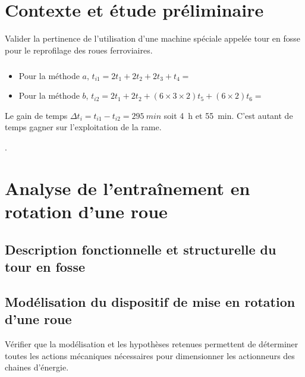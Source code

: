 \documentclass[10pt,fleqn]{article} %
\begin{document}

\vspace{4.5cm}
\pagestyle{fancy}
\thispagestyle{plain}


\def\columnseprulecolor{\color{ocre}}
\setlength{\columnseprule}{0.4pt} 

\section{Contexte et étude préliminaire}

\begin{obj}
Valider la pertinence de l’utilisation d’une machine spéciale appelée tour en fosse pour le reprofilage
des roues ferroviaires.
\end{obj}

\subparagraph{}

\begin{itemize}
\item Pour la méthode $a$, $t_{i1} =2t_1+2t_2+ 2t_3 +t_4 = $ %
\item Pour la méthode $b$, $t_{i2} =2t_1+2t_2+ \left( 6\times 3 \times 2 \right)t_5 +\left( 6 \times 2 \right)t_6 =$%
\end{itemize}

Le gain de temps $\Delta t_i = t_{i1}-t_{i2}=\SI{295}{min}$ soit \SI{4}{h} et \SI{55}{min}. C'est autant de temps gagner sur l'exploitation de la rame. 


.

\section{Analyse de l’entraînement en rotation d’une roue}
\subsection{Description fonctionnelle et structurelle du tour en fosse}
\subsection{Modélisation du dispositif de mise en rotation d’une roue}


\begin{obj}
Vérifier que la modélisation et les hypothèses retenues permettent de déterminer toutes les actions mécaniques nécessaires pour dimensionner les actionneurs des chaines d’énergie.
\end{obj}
\end{document}
